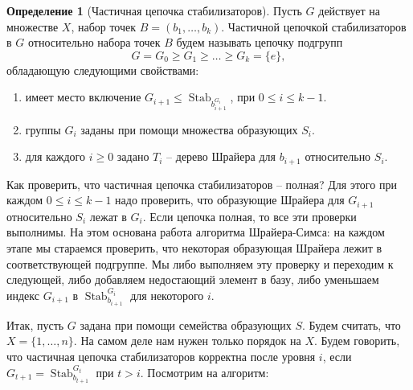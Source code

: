 \documentclass[10pt,a4paper,oneside]{book}
\theoremstyle{definition}
\newtheorem*{defn}{\color{yellow!30!red} Определение}
\renewcommand{\leq}{\leqslant}
\renewcommand{\geq}{\geqslant}
\newcommand{\Stab}{\operatorname{Stab}}
\def\dfn{\begin{defn}}
\def\edfn{\end{defn}}
\def\enm{\begin{enumerate}}
\def\eenm{\end{enumerate}}
\begin{document}
\dfn[Частичная цепочка стабилизаторов]
Пусть $G$ действует на множестве $X$, набор точек $B=(b_1,\dots,b_k)$. Частичной цепочкой стабилизаторов в $G$ относительно набора точек $B$ будем называть цепочку подгрупп 
$$G=G_0\geq G_1 \geq \dots \geq G_k=\{e\},$$
обладающую следующими свойствами:
\enm
\item имеет место включение $G_{i+1}\leq \Stab_{b_{i+1}^{G_i}}$, при $0\leq i\leq k-1$.
\item группы $G_i$ заданы при помощи множества образующих $S_i$.
\item для каждого $i\geq 0$ задано $T_i$ -- дерево Шрайера для $b_{i+1}$ относительно $S_i$.
\eenm
\edfn

Как проверить, что частичная цепочка стабилизаторов -- полная? Для этого при каждом $0\leq i\leq k-1$ надо проверить, что образующие Шрайера для $G_{i+1}$ относительно $S_i$ лежат в $G_i$. Если цепочка полная, то все эти проверки выполнимы. На этом основана работа алгоритма Шрайера-Симса: на каждом этапе мы стараемся проверить, что некоторая образующая Шрайера лежит в соответствующей подгруппе. Мы либо выполняем эту проверку и переходим к следующей, либо добавляем недостающий элемент в базу, либо уменьшаем индекс $G_{i+1}$ в $\Stab_{b_{i+1}}^{G_i}$ для некоторого $i$. 

Итак, пусть $G$ задана при помощи семейства образующих $S$. Будем считать, что $X=\{1,\dots,n\}$. На самом деле нам нужен только порядок на $X$. Будем говорить, что частичная цепочка стабилизаторов корректна после уровня $i$, если $G_{t+1}=\Stab_{b_{t+1}}^{G_t}$ при $t> i$. Посмотрим на алгоритм:
\end{document}
